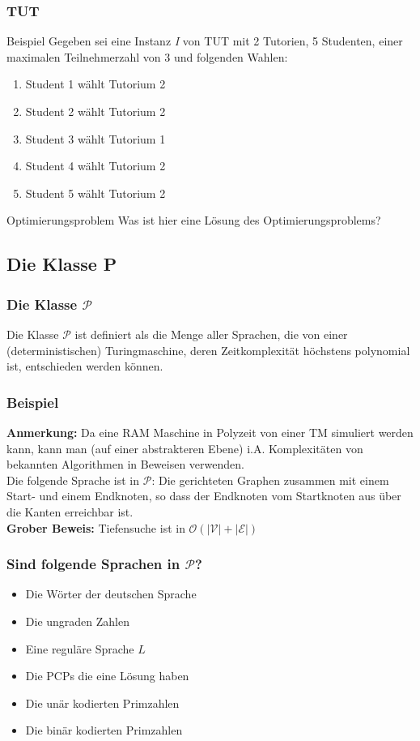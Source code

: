 \documentclass{beamer}
\begin{document}
{\begin{frame}
\frametitle{TUT}
\begin{block}{Beispiel}
 Gegeben sei eine Instanz \textit{I} von TUT mit 2 Tutorien, 5 Studenten, einer maximalen Teilnehmerzahl von 3 und folgenden Wahlen:
 \begin{enumerate}
  \item Student 1 wählt Tutorium 2
  \item Student 2 wählt Tutorium 2
  \item Student 3 wählt Tutorium 1
  \item Student 4 wählt Tutorium 2
  \item Student 5 wählt Tutorium 2
 \end{enumerate}
\end{block}
\begin{block}{Optimierungsproblem}
 Was ist hier eine Lösung des Optimierungsproblems? 
\end{block}
\end{frame}

\subsection{Die Klasse P}
\begin{frame}
\frametitle{Die Klasse $\mathcal{P}$}
Die Klasse $\mathcal{P}$ ist definiert als die Menge aller Sprachen, die von einer (deterministischen) Turingmaschine, deren Zeitkomplexität höchstens polynomial ist, entschieden werden können.\\[6pt]
\end{frame}

\begin{frame}
\frametitle{Beispiel}
\textbf{Anmerkung:} Da eine RAM Maschine in Polyzeit von einer TM simuliert werden kann, kann man (auf einer abstrakteren Ebene) i.A. Komplexitäten von bekannten Algorithmen in Beweisen verwenden.\\[10pt]
Die folgende Sprache ist in $\mathcal{P}$: Die gerichteten Graphen zusammen mit einem Start- und einem Endknoten, so dass der Endknoten vom Startknoten aus über die Kanten erreichbar ist.\\[6pt]
\textbf{Grober Beweis:}	Tiefensuche ist in $\mathcal{O}(|\mathcal{V}| + |\mathcal{E}|)$
\end{frame}

\begin{frame}
\frametitle{Sind folgende Sprachen in $\mathcal{P}$?}
\begin{itemize}
\item Die Wörter der deutschen Sprache
\item Die ungraden Zahlen
\item Eine reguläre Sprache $L$
\item Die PCPs die eine Lösung haben
\item Die unär kodierten Primzahlen
\item Die binär kodierten Primzahlen
\end{itemize}
\end{frame}

}
\end{document}
